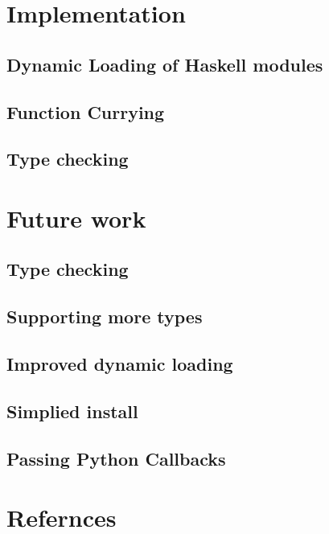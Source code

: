 \documentclass[11pt, letterpaper, oneside, twocolumn] {article}
\begin{document}
\section{Implementation}


\subsection{Dynamic Loading of Haskell modules}


\subsection{Function Currying}


\subsection{Type checking}


\section{Future work}

\subsection{Type checking}


\subsection{Supporting more types}


\subsection{Improved dynamic loading}


\subsection{Simplied install}


\subsection{Passing Python Callbacks}

\section{Refernces}

\end{document}
